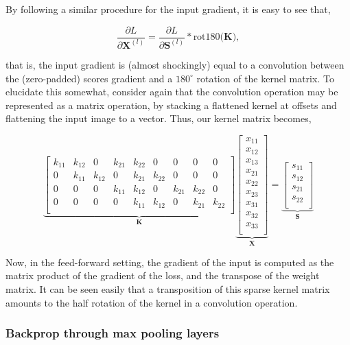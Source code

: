 By following a similar procedure for the input gradient, it is easy to see that,

$$\frac{\partial L}{\partial \mathbf{X}^{(l)}} = \frac{\partial L}{\partial \mathbf{S}^{(l)}} * \text{rot180}\big(\mathbf{K}\big),$$

that is, the input gradient is (almost shockingly) equal to a convolution between the (zero-padded) scores gradient and a $180^{\circ}$ rotation of the kernel matrix. To elucidate this somewhat, consider again that the convolution operation may be represented as a matrix operation, by stacking a flattened kernel at offsets and flattening the input image to a vector. Thus, our kernel matrix becomes,

$$
\underbrace{\begin{bmatrix}
k_{11} & k_{12} & 0 & k_{21} & k_{22} & 0 & 0 & 0 & 0 \\
0 & k_{11} & k_{12} & 0 & k_{21} & k_{22} & 0 & 0 & 0 \\
0 & 0 & 0 & k_{11} & k_{12} & 0 & k_{21} & k_{22} & 0 \\
0 & 0 & 0 & 0 & k_{11} & k_{12} & 0 & k_{21} & k_{22} \\
\end{bmatrix}}_{\mathbf{K}}
\underbrace{\begin{bmatrix}
x_{11} \\
x_{12} \\
x_{13} \\
x_{21} \\
x_{22} \\
x_{23} \\
x_{31} \\
x_{32} \\
x_{33} \\
\end{bmatrix}}_{\mathbf{X}} =
\underbrace{\begin{bmatrix}
s_{11} \\
s_{12} \\
s_{21} \\
s_{22} \\
\end{bmatrix}}_{\mathbf{S}}
$$

Now, in the feed-forward setting, the gradient of the input is computed as the matrix product of the gradient of the loss, and the transpose of the weight matrix. It can be seen easily that a transposition of this sparse kernel matrix amounts to the half rotation of the kernel in a convolution operation.

\subsubsection{Backprop through max pooling layers}

